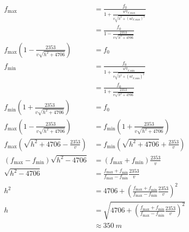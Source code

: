 \documentclass{article}
\begin{document}
\begin{enumerate}
        \begin{align*}
          f_\text{max}                                                     & = \frac{f_0}{1 + \frac{u^2 t_{S,\text{max}}}{v \sqrt{h^2 + (u t_{S,\text{max}})^2}}}                            \\
                                                                           & = \frac{f_0}{1 - \frac{2353}{v \sqrt{h^2 + 4706}}}                                                              \\
          f_\text{max} \left( 1 - \frac{2353}{v \sqrt{h^2 + 4706}} \right) & = f_0                                                                                                           \\
          f_\text{min}                                                     & = \frac{f_0}{1 + \frac{u^2 t_{S,\text{min}}}{v \sqrt{h^2 + (u t_{S,\text{min}})^2}}}                            \\
                                                                           & = \frac{f_0}{1 + \frac{2353}{v \sqrt{h^2 + 4706}}}                                                              \\
          f_\text{min} \left( 1 + \frac{2353}{v \sqrt{h^2 + 4706}} \right) & = f_0                                                                                                           \\
          f_\text{max} \left( 1 - \frac{2353}{v \sqrt{h^2 + 4706}} \right) & = f_\text{min} \left( 1 + \frac{2353}{v \sqrt{h^2 + 4706}} \right)                                              \\
          f_\text{max} \left( \sqrt{h^2 + 4706} - \frac{2353}{v} \right)   & = f_\text{min} \left( \sqrt{h^2 + 4706} + \frac{2353}{v} \right)                                                \\
          (f_\text{max} - f_\text{min}) \sqrt{h^2 - 4706}                  & = (f_\text{max} + f_\text{min}) \frac{2353}{v}                                                                  \\
          \sqrt{h^2 - 4706}                                                & = \frac{f_\text{max} + f_\text{min}}{f_\text{max} - f_\text{min}} \frac{2353}{v}                                \\
          h^2                                                              & = 4706 + \left( \frac{f_\text{max} + f_\text{min}}{f_\text{max} - f_\text{min}} \frac{2353}{v} \right)^2        \\
          h                                                                & = \sqrt{4706 + \left( \frac{f_\text{max} + f_\text{min}}{f_\text{max} - f_\text{min}} \frac{2353}{v} \right)^2} \\
                                                                           & \approx \qty{350}{m}
        \end{align*}
\end{enumerate}
\end{document}
